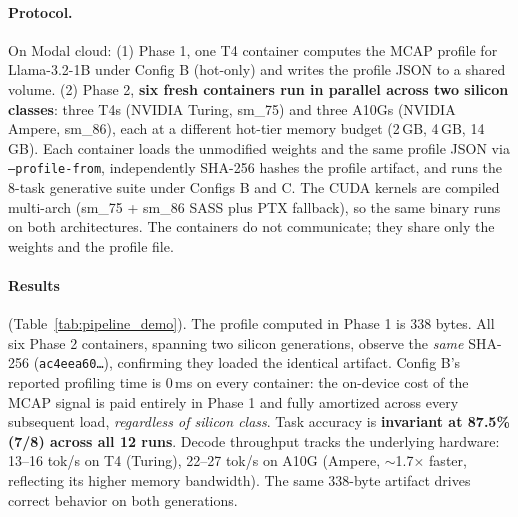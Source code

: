 \documentclass{article}
\begin{document}
\paragraph{Protocol.} On Modal cloud: (1) Phase 1, one T4 container computes the MCAP
profile for Llama-3.2-1B under Config B (hot-only) and writes the profile JSON to a
shared volume. (2) Phase 2, \textbf{six fresh containers run in parallel across two
silicon classes}: three T4s (NVIDIA Turing, sm\_75) and three A10Gs (NVIDIA Ampere,
sm\_86), each at a different hot-tier memory budget (2\,GB, 4\,GB, 14\,GB). Each
container loads the unmodified weights and the same profile JSON via
\texttt{--profile-from}, independently SHA-256 hashes the profile artifact, and runs
the 8-task generative suite under Configs B and C. The CUDA kernels are compiled
multi-arch (sm\_75 + sm\_86 SASS plus PTX fallback), so the same binary runs on both
architectures. The containers do not communicate; they share only the weights and the
profile file.

\paragraph{Results} (Table~\ref{tab:pipeline_demo}). The profile computed in Phase 1 is
338 bytes. All six Phase 2 containers, spanning two silicon generations, observe the
\emph{same} SHA-256 (\texttt{ac4eea60\ldots}), confirming they loaded the identical
artifact. Config B's reported profiling time is 0\,ms on every container: the on-device
cost of the MCAP signal is paid entirely in Phase 1 and fully amortized across every
subsequent load, \emph{regardless of silicon class}. Task accuracy is \textbf{invariant
at 87.5\% (7/8) across all 12 runs}. Decode throughput tracks the underlying hardware:
13--16 tok/s on T4 (Turing), 22--27 tok/s on A10G (Ampere, $\sim$1.7$\times$ faster,
reflecting its higher memory bandwidth). The same 338-byte artifact drives correct
behavior on both generations.
\end{document}
